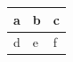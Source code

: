 \documentclass{article}
\begin{document}
\begin{tabularx}{\textwidth}{|c|l|X|}
 a & b & c \\ \hline
 d & e & f \\ \hline
\end{tabularx}
\end{document}
